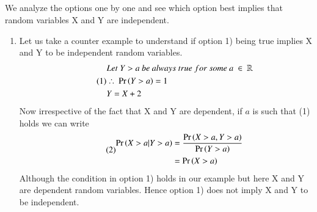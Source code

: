 \documentclass[journal,12pt,twocolumn]{IEEEtran}
\begin{document}
\subsection*{}
We analyze the options one by one and see which option best implies that random variables X and Y are independent. \\
\begin{enumerate}
    \item Let us take a counter example to understand if option 1) being true implies X and Y to be independent random variables.
\begin{align}\tag{1}
    \begin{split}
        &Let\ Y > a\ be\ always\ true\ for\ some\ a\ \in\ \mathbb{R}\\
        &\therefore\ \pr{Y>a} = 1\\
        &Y = X + 2
    \end{split}
\end{align}
Now irrespective of the fact that X and Y are dependent, if $a$ is such that (1) holds we can write
\begin{align}\tag{2}
    \begin{split}
        \Pr\left(X>a|Y>a\right) &= \frac{\Pr\left(X>a, Y>a\right)}{\Pr\left(Y>a\right)}\\
                     &= \Pr\left(X>a\right)
    \end{split}
\end{align}
Although the condition in option 1) holds in our example but here X and Y are dependent random variables. Hence option 1) does not imply X and Y to be independent.\\


\end{enumerate}
\end{document}
